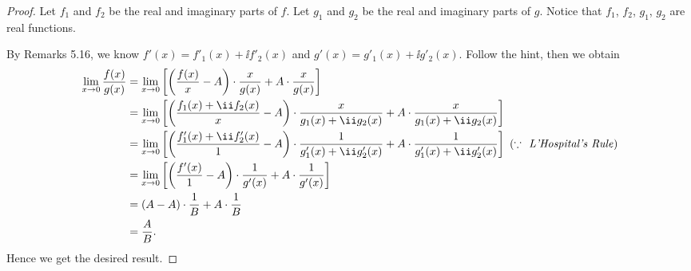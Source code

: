 \begin{Exercise}
	\begin{proof}
		Let $f_1$ and $f_2$ be the real and imaginary parts of $f$.
		Let $g_1$ and $g_2$ be the real and imaginary parts of $g$.
		Notice that $f_1$, $f_2$, $g_1$, $g_2$ are real functions.
		
		By Remarks 5.16, we know $f'(x) = f'_1(x) + \ii f'_2(x)$ and $g'(x) = g'_1(x) + \ii g'_2(x)$.
		Follow the hint, then we obtain
		\begin{align*}
		\lim_{x\to 0}\frac{f(x)}{g(x)}
		&= \lim_{x\to 0}\left[ \left( \frac{f(x)}{x}-A\right)\cdot\frac{x}{g(x)} + A \cdot \frac{x}{g(x)}\right] \\
		&= \lim_{x\to 0}\left[ \left( \frac{f_1(x)+\ii f_2(x)}{x}-A\right)\cdot\frac{x}{g_1(x)+\ii g_2(x)} + A \cdot \frac{x}{g_1(x)+\ii g_2(x)}\right] \\
		&= \lim_{x\to 0}\left[ \left( \frac{f'_1(x)+\ii f'_2(x)}{1}-A\right)\cdot\frac{1}{g'_1(x)+\ii g'_2(x)} + A \cdot \frac{1}{g'_1(x)+\ii g'_2(x)}\right] \mbox{
			($\because$~~\textit{L'Hospital's Rule})}\\
		&= \lim_{x\to 0}\left[ \left( \frac{f'(x)}{1}-A\right)\cdot\frac{1}{g'(x)} + A \cdot \frac{1}{g'(x)}\right] \\
		&= (A-A) \cdot \frac{1}{B} + A \cdot \frac{1}{B} \\
		&= \frac{A}{B}.
		\end{align*}
		Hence we get the desired result.
	\end{proof}
\end{Exercise}